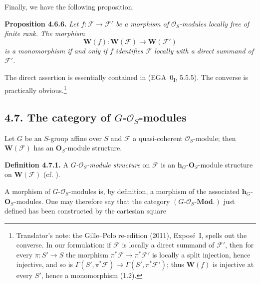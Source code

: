 Finally, we have the following proposition.

\medskip
\noindent{}\textbf{Proposition 4.6.6.}
\textit{Let \(f:\mathscr F\to\mathscr F'\) be a morphism of
\(\mathcal O_S\)-modules locally free of finite rank. The morphism
\[
  \mathbf W(f):\mathbf W(\mathscr F)\longrightarrow\mathbf W(\mathscr F')
\]
is a monomorphism if and only if \(f\) identifies \(\mathscr F\)
locally with a direct summand of \(\mathscr F'\).}

The direct assertion is essentially contained in (EGA~0\textsubscript{I},
5.5.5). The converse is practically obvious.\footnote{Translator's note: the Gille--Polo re-edition (2011), Exposé~I, spells out
the converse. In our formulation: if \(\mathscr F\) is locally a direct
summand of \(\mathscr F'\), then for every \(\pi:S'\to S\) the morphism
\(\pi^*\mathscr F\to\pi^*\mathscr F'\) is locally a split injection, hence
injective, and so is \(\Gamma(S',\pi^*\mathscr F)\to\Gamma(S',\pi^*\mathscr F')\);
thus \(\mathbf W(f)\) is injective at every \(S'\), hence a monomorphism
(1.2).}

\subsection*{4.7. The category of \(G\)-\(\mathcal O_S\)-modules}

Let \(G\) be an \(S\)-group affine over \(S\) and \(\mathscr F\) a
quasi-coherent \(\mathcal O_S\)-module; then \(\mathbf W(\mathscr F)\) has an
\(\mathbf O_S\)-module structure.

\medskip
\noindent{}\textbf{Definition 4.7.1.}
A \emph{\(G\)-\(\mathcal O_S\)-module structure} on \(\mathscr F\) is
an \(\mathbf h_G\)-\(\mathbf O_S\)-module structure on
\(\mathbf W(\mathscr F)\) (cf. ).

A morphism of \(G\)-\(\mathcal O_S\)-modules is, by definition, a morphism
of the associated \(\mathbf h_G\)-\(\mathbf O_S\)-modules. One may
therefore say that the category
\((G\text{-}\mathcal O_S\text{-}\mathbf{Mod.})\) just defined has been
constructed by the cartesian square

